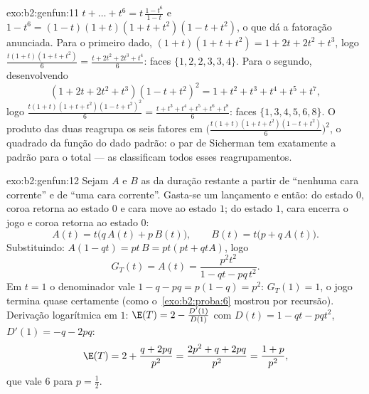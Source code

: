 \begin{solution}{exo:b2:genfun:11}
$t + \dots + t^6 = t\,\frac{1 - t^6}{1 - t}$ e $1 - t^6 =
(1 - t)(1 + t)(1 + t + t^2)(1 - t + t^2)$, o que dá a
fatoração anunciada. Para o primeiro dado, $(1 + t)(1 + t + t^2) = 1 +
2t + 2t^2 + t^3$, logo $\frac{t(1+t)(1+t+t^2)}6 = \frac{t +
2t^2 + 2t^3 + t^4}6$: faces $\{1, 2, 2, 3, 3, 4\}$. Para o
segundo, desenvolvendo
\[
(1 + 2t + 2t^2 + t^3)(1 - t + t^2)^2 = 1 + t^2 + t^3 + t^4 +
t^5 + t^7,
\]
logo $\frac{t(1+t)(1+t+t^2)(1-t+t^2)^2}6 = \frac{t + t^3 + t^4
+ t^5 + t^6 + t^8}6$: faces $\{1, 3, 4, 5, 6, 8\}$. O
produto das duas  reagrupa os seis
fatores em $\bigl(\frac{t(1+t)(1+t+t^2)(1-t+t^2)}6
\bigr)^2$, o quadrado da função do dado padrão: o
par de Sicherman tem exatamente a  padrão para o total ---
as  classificam todos esses reagrupamentos.
\end{solution}

\begin{solution}{exo:b2:genfun:12}
Sejam $A$ e $B$ as  da duração restante
a partir de ``nenhuma cara corrente'' e de ``uma cara
corrente''. Gasta-se um lançamento e então: do estado $0$, coroa
retorna ao estado $0$ e cara move ao estado $1$; do estado
$1$, cara encerra o jogo e coroa retorna ao estado $0$:
\[
A(t) = t\bigl(q\,A(t) + p\,B(t)\bigr),
\qquad
B(t) = t\bigl(p + q\,A(t)\bigr).
\]
Substituindo: $A(1 - qt) = pt\,B = pt(pt + qtA)$, logo
\[
G_T(t) = A(t) = \frac{p^2t^2}{1 - qt - pq\,t^2} .
\]
Em $t = 1$ o denominador vale $1 - q - pq = p(1 - q) = p^2$:
$G_T(1) = 1$, o jogo termina quase certamente (como
o~\cref{exo:b2:proba:6} mostrou por recursão). Derivação
logarítmica em $1$: $\E(T) = 2 - \frac{D'(1)}{D(1)}$ com
$D(t) = 1 - qt - pqt^2$, $D'(1) = -q - 2pq$:
\[
\E(T) = 2 + \frac{q + 2pq}{p^2} = \frac{2p^2 + q + 2pq}{p^2}
= \frac{1 + p}{p^2},
\]
que vale $6$ para $p = \frac12$.
\end{solution}

